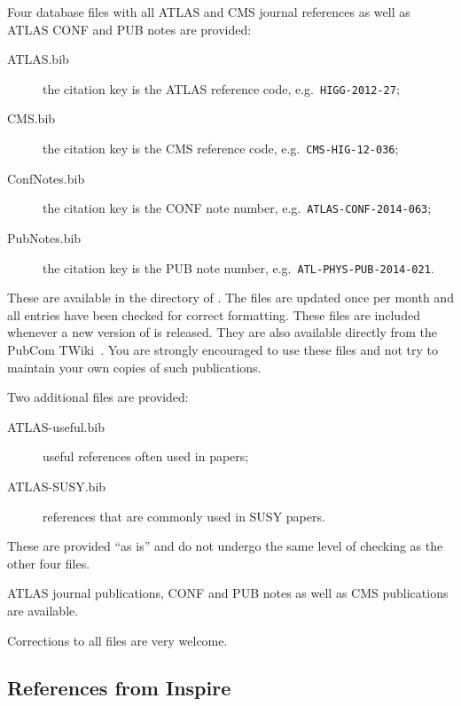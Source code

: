 \documentclass[UKenglish, texlive=2016]{atlasdoc}
\begin{document}
Four database files with all ATLAS and CMS journal references as well as
ATLAS CONF and PUB notes are provided:
\begin{description}
\item[ATLAS.bib] the citation key is the ATLAS reference code, e.g.\ \texttt{HIGG-2012-27};
\item[CMS.bib] the citation key is the CMS reference code, e.g.\ \texttt{CMS-HIG-12-036};
\item[ConfNotes.bib] the citation key is the CONF note number, e.g.\ \texttt{ATLAS-CONF-2014-063};
\item[PubNotes.bib] the citation key is the PUB note number, e.g.\ \texttt{ATL-PHYS-PUB-2014-021}.
\end{description}
These are available in the directory  of .
The files are updated once per month and all entries have been checked for correct formatting.
These files are included whenever a new version of  is released.
They are also available directly from the PubCom TWiki~\cite{pubcom-refs}.
You are strongly encouraged to use these files and not try to maintain your own copies of
such publications.

Two additional files are provided:
\begin{description}
  \item[ATLAS-useful.bib] useful references often used in papers;
  \item[ATLAS-SUSY.bib] references that are commonly used in SUSY papers.
\end{description}
These are provided \enquote{as is} and do not undergo the same level of checking as the other four files.

 ATLAS journal publications, CONF and PUB notes as well as
CMS publications are available.

Corrections to all files are very welcome.

\subsection{References from Inspire}
\label{sc:inquire}
\end{document}

